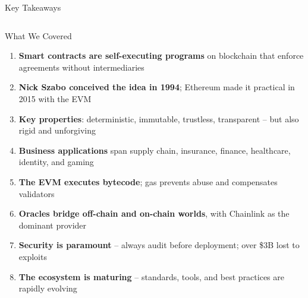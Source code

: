 \documentclass[8pt,aspectratio=169]{beamer}
\begin{document}

\begin{frame}{Key Takeaways}
\begin{columns}[T]
\begin{block}{What We Covered}
\footnotesize
\begin{enumerate}
  \item \textcolor{mlblue}{\textbf{Smart contracts are self-executing programs}} on blockchain that enforce agreements without intermediaries
  \item \textcolor{mlgreen}{\textbf{Nick Szabo conceived the idea in 1994}}; Ethereum made it practical in 2015 with the EVM
  \item \textcolor{mlorange}{\textbf{Key properties}}: deterministic, immutable, trustless, transparent -- but also rigid and unforgiving
  \item \textcolor{mlpurple}{\textbf{Business applications}} span supply chain, insurance, finance, healthcare, identity, and gaming
  \item \textcolor{mlred}{\textbf{The EVM executes bytecode}}; gas prevents abuse and compensates validators
  \item \textcolor{mlblue}{\textbf{Oracles bridge off-chain and on-chain worlds}}, with Chainlink as the dominant provider
  \item \textcolor{mlgreen}{\textbf{Security is paramount}} -- always audit before deployment; over \$3B lost to exploits
  \item \textcolor{mlorange}{\textbf{The ecosystem is maturing}} -- standards, tools, and best practices are rapidly evolving
\end{enumerate}
\end{block}


\end{columns}
\end{frame}
\end{document}
